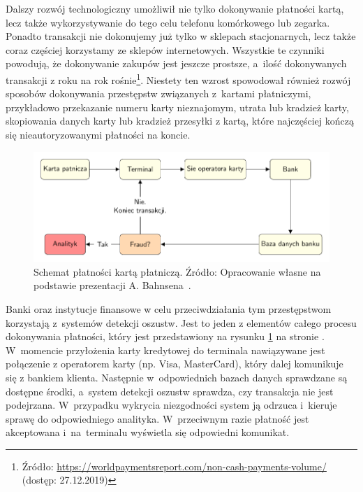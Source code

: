 \documentclass[inzynierska]{pwr_wmat_praca_dyplomowa}
\theoremstyle{plain}
\numberwithin{theorem}{chapter}
\theoremstyle{definition}
\numberwithin{theorem}{chapter}
\begin{document}
Dalszy rozwój technologiczny umożliwił nie tylko dokonywanie płatności kartą, lecz także wykorzystywanie do tego celu telefonu komórkowego lub zegarka. Ponadto transakcji nie dokonujemy już tylko w sklepach stacjonarnych, lecz także coraz częściej korzystamy ze sklepów internetowych. Wszystkie te czynniki powodują, że dokonywanie zakupów jest jeszcze prostsze, a~ilość dokonywanych transakcji z roku na rok rośnie\footnote{Źródło: \url{https://worldpaymentsreport.com/non-cash-payments-volume/} (dostęp: 27.12.2019)}. Niestety ten wzrost spowodował również rozwój sposobów dokonywania przestępstw związanych z~kartami płatniczymi, przykładowo przekazanie numeru karty nieznajomym, utrata lub kradzież karty, skopiowania danych karty lub kradzież przesyłki z kartą, które najczęściej kończą się nieautoryzowanymi płatności na koncie.

\begin{figure}[h]
	\includegraphics[width=\linewidth]{plots/transaction_schema.pdf}
	\caption{Schemat płatności kartą płatniczą. Źródło: Opracowanie własne na podstawie prezentacji A. Bahnsena~\cite{bahnsen_presentation}.}
	\label{fig:credit-card-flow}
\end{figure}

Banki oraz instytucje finansowe w celu przeciwdziałania tym przestępstwom korzystają z~systemów detekcji oszustw. Jest to jeden z elementów całego procesu dokonywania płatności, który jest przedstawiony na rysunku \ref{fig:credit-card-flow} na stronie \pageref{fig:credit-card-flow}. W~momencie przyłożenia karty kredytowej do terminala nawiązywane jest połączenie z operatorem karty (np. Visa, MasterCard), który dalej komunikuje się z bankiem klienta. Następnie w~odpowiednich bazach danych sprawdzane są dostępne środki, a~system detekcji oszustw sprawdza, czy transakcja nie jest podejrzana. W~przypadku wykrycia niezgodności system ją odrzuca i~kieruje sprawę do odpowiedniego analityka. W~przeciwnym razie płatność jest akceptowana i~na~terminalu wyświetla się odpowiedni komunikat.
\end{document}
